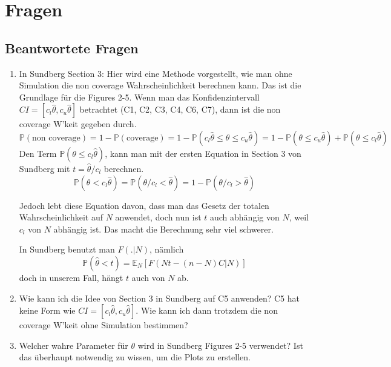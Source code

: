\chapter{Fragen}


\section{Beantwortete Fragen}

\begin{enumerate}
	\item 
	In Sundberg Section 3: Hier wird eine Methode vorgestellt, wie man ohne Simulation die non coverage Wahrscheinlichkeit berechnen kann.
	Das ist die Grundlage für die Figures 2-5. Wenn man das Konfidenzintervall $CI = [c_l \hat \theta, c_u \hat \theta]$ betrachtet (C1, C2, C3, C4, C6, C7), dann ist die non coverage W'keit gegeben durch.
	\[
		\mathbb{P} \left( \text{non coverage} \right)
		=
		1 - \mathbb{P} \left( \text{coverage} \right)
		=
		1 - \mathbb{P} \left( c_l \hat \theta \leq \theta \leq c_u \hat \theta \right)
		=
		1 - 
			\mathbb{P} \left( \theta \leq c_u \hat \theta \right)  
			+ 
			\mathbb{P} \left( \theta \leq c_l \hat \theta \right) 
	\]
	Den Term $\mathbb{P} \left( \theta \leq c_l \hat \theta \right)$, kann man mit der ersten Equation in Section 3 von Sundberg mit $t = \hat \theta / c_l$ berechnen.
	\[
		\mathbb{P} \left( \theta < c_l \hat \theta  \right) 
		=
		\mathbb{P} \left( \theta / c_l < \hat \theta  \right)
		=
		1 - \mathbb{P} \left( \theta / c_l > \hat \theta  \right)
	\]
	
	Jedoch lebt diese Equation davon, dass man das Gesetz der totalen Wahrscheinlichkeit auf $N$ anwendet, doch nun ist $t$ auch abhängig von $N$, weil $c_l$ von $N$ abhängig ist.
	Das macht die Berechnung sehr viel schwerer.
	
	In Sundberg benutzt man $F(. | N)$, nämlich
	\[
		\mathbb{P} \left( \hat \theta < t \right)
		=
		\mathbb{E}_N
		\left[
			F(Nt - (n-N)C | N)
		\right]
	\]
	doch in unserem Fall, hängt $t$ auch von $N$ ab.
	
	\item Wie kann ich die Idee von Section 3 in Sundberg auf C5 anwenden? C5 hat keine Form wie $CI = [c_l \hat \theta, c_u \hat \theta]$. Wie kann ich dann trotzdem die non coverage W'keit ohne Simulation bestimmen?
	
	\item 
	Welcher wahre Parameter für $\theta$ wird in Sundberg Figures 2-5 verwendet? Ist das überhaupt notwendig zu wissen, um die Plots zu erstellen.
	

\end{enumerate}
